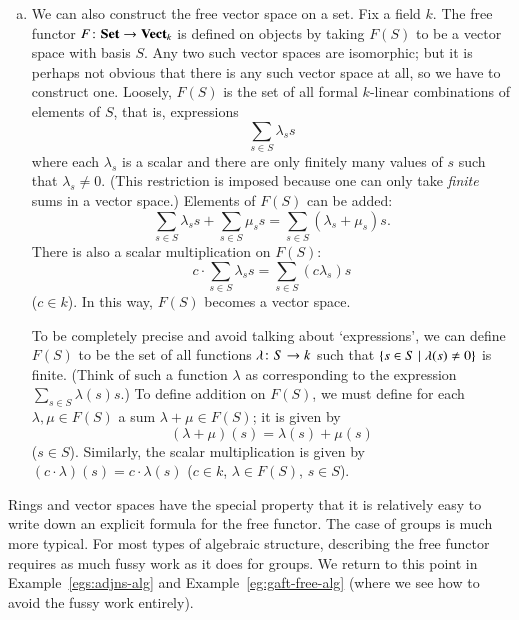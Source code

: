\begin{examples}
\begin{enumerate}[(b)]
\item
\label{eg:free-vs}
We can also construct the free%
%
%
vector space on a set.  Fix a field $k$.  The free functor $F\from \Set \to
\Vect_k$ is defined on objects by taking $F(S)$ to be a vector space with
basis $S$.  Any two such vector spaces are isomorphic; but it is perhaps
not obvious that there is any such vector space at all, so we have to
construct one.  Loosely, $F(S)$ is the set of all formal $k$-linear
combinations of elements of $S$, that is, expressions
\[
\sum_{s \in S} \lambda_s s
\]
where each $\lambda_s$ is a scalar and there are only finitely many values
of $s$ such that $\lambda_s \neq 0$.  (This restriction is imposed because
one can only take \emph{finite} sums in a vector space.)  Elements of
$F(S)$ can be added:
\[
\sum_{s \in S} \lambda_s s + \sum_{s \in S} \mu_s s
=
\sum_{s \in S} (\lambda_s + \mu_s) s.
\]
There is also a scalar multiplication on $F(S)$:
\[
c \cdot \sum_{s \in S} \lambda_s s
=
\sum_{s \in S} (c \lambda_s) s
\]
($c \in k$).  In this way, $F(S)$ becomes a vector space.

To be completely precise and avoid talking about `expressions', we
can define $F(S)$ to be the set of all functions $\lambda\from S \to k$ such
that $\{ s \in S \mathrel{|} \lambda(s) \neq 0\}$ is finite.  (Think of such a
function $\lambda$ as corresponding to the expression $\sum_{s \in S}
\lambda(s) s$.)  To define addition on $F(S)$, we must define for each
$\lambda, \mu \in F(S)$ a sum $\lambda + \mu \in F(S)$; it is given by
\[
(\lambda + \mu)(s) = \lambda(s) + \mu(s)
\]
($s \in S$). Similarly, the scalar multiplication is given by $(c \cdot
\lambda)(s) = c\cdot \lambda(s)$ ($c \in k$, $\lambda \in F(S)$, $s \in
S$).
\end{enumerate}

Rings and vector spaces have the special property that it is relatively
easy to write down an explicit formula for the free functor.  The case of
groups is much more typical.  For most types of algebraic structure,
describing the free functor requires as much fussy work as it does for
groups.  We return to this point in Example~\ref{egs:adjns-alg} and
Example~\ref{eg:gaft-free-alg} (where we see how to avoid the fussy work
entirely).
\end{examples}

